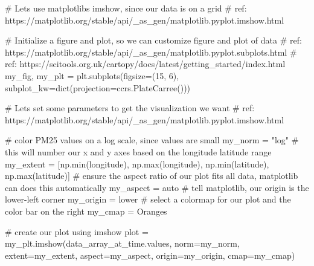 \documentclass[
  letterpaper,
  DIV=11,
  numbers=noendperiod]{scrreprt}
\newenvironment{Shaded}{\begin{snugshade}}{\end{snugshade}}
\newcommand{\BuiltInTok}[1]{\textcolor[rgb]{0.00,0.23,0.31}{#1}}
\newcommand{\CommentTok}[1]{\textcolor[rgb]{0.37,0.37,0.37}{#1}}
\newcommand{\DecValTok}[1]{\textcolor[rgb]{0.68,0.00,0.00}{#1}}
\newcommand{\NormalTok}[1]{\textcolor[rgb]{0.00,0.23,0.31}{#1}}
\newcommand{\OperatorTok}[1]{\textcolor[rgb]{0.37,0.37,0.37}{#1}}
\newcommand{\StringTok}[1]{\textcolor[rgb]{0.13,0.47,0.30}{#1}}
\begin{document}
\begin{Shaded}
\begin{Highlighting}[]
\CommentTok{\# Let\textquotesingle{}s use matplotlib\textquotesingle{}s imshow, since our data is on a grid}
\CommentTok{\# ref: https://matplotlib.org/stable/api/\_as\_gen/matplotlib.pyplot.imshow.html}

\CommentTok{\# Initialize a figure and plot, so we can customize figure and plot of data}
\CommentTok{\# ref: https://matplotlib.org/stable/api/\_as\_gen/matplotlib.pyplot.subplots.html}
\CommentTok{\# ref: https://scitools.org.uk/cartopy/docs/latest/getting\_started/index.html}
\NormalTok{my\_fig, my\_plt }\OperatorTok{=}\NormalTok{ plt.subplots(figsize}\OperatorTok{=}\NormalTok{(}\DecValTok{15}\NormalTok{, }\DecValTok{6}\NormalTok{), subplot\_kw}\OperatorTok{=}\BuiltInTok{dict}\NormalTok{(projection}\OperatorTok{=}\NormalTok{ccrs.PlateCarree()))}

\CommentTok{\# Let\textquotesingle{}s set some parameters to get the visualization we want}
\CommentTok{\# ref: https://matplotlib.org/stable/api/\_as\_gen/matplotlib.pyplot.imshow.html}

\CommentTok{\# color PM25 values on a log scale, since values are small}
\NormalTok{my\_norm }\OperatorTok{=} \StringTok{"log"} 
\CommentTok{\# this will number our x and y axes based on the longitude latitude range}
\NormalTok{my\_extent }\OperatorTok{=}\NormalTok{ [np.}\BuiltInTok{min}\NormalTok{(longitude), np.}\BuiltInTok{max}\NormalTok{(longitude), np.}\BuiltInTok{min}\NormalTok{(latitude), np.}\BuiltInTok{max}\NormalTok{(latitude)]}
\CommentTok{\# ensure the aspect ratio of our plot fits all data, matplotlib can does this automatically}
\NormalTok{my\_aspect }\OperatorTok{=} \StringTok{\textquotesingle{}auto\textquotesingle{}}
\CommentTok{\# tell matplotlib, our origin is the lower{-}left corner}
\NormalTok{my\_origin }\OperatorTok{=} \StringTok{\textquotesingle{}lower\textquotesingle{}}
\CommentTok{\# select a colormap for our plot and the color bar on the right}
\NormalTok{my\_cmap }\OperatorTok{=} \StringTok{\textquotesingle{}Oranges\textquotesingle{}}

\CommentTok{\# create our plot using imshow}
\NormalTok{plot }\OperatorTok{=}\NormalTok{ my\_plt.imshow(data\_array\_at\_time.values, norm}\OperatorTok{=}\NormalTok{my\_norm, extent}\OperatorTok{=}\NormalTok{my\_extent, }
\NormalTok{          aspect}\OperatorTok{=}\NormalTok{my\_aspect, origin}\OperatorTok{=}\NormalTok{my\_origin, cmap}\OperatorTok{=}\NormalTok{my\_cmap)}


\end{Highlighting}
\end{Shaded}
\end{document}
